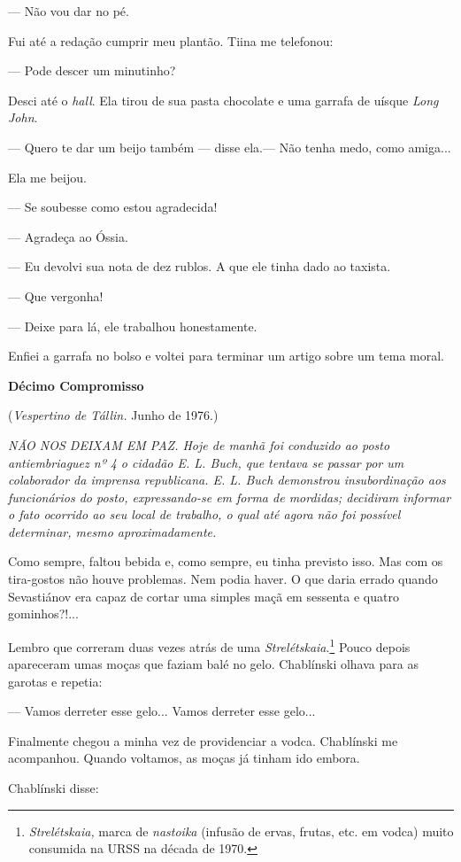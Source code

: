 --- Não vou dar no pé.

Fui até a redação cumprir meu plantão. Tiina me telefonou:

--- Pode descer um minutinho?

Desci até o \emph{hall}. Ela tirou de sua pasta chocolate e uma garrafa
de uísque \emph{Long John}.

--- Quero te dar um beijo também --- disse ela.--- Não tenha medo, como
amiga...

Ela me beijou.

--- Se soubesse como estou agradecida!

--- Agradeça ao Óssia.

--- Eu devolvi sua nota de dez rublos. A que ele tinha dado ao taxista.

--- Que vergonha!

--- Deixe para lá, ele trabalhou honestamente.

Enfiei a garrafa no bolso e voltei para terminar um artigo sobre um tema
moral.

\textbf{Décimo Compromisso}

(\emph{Vespertino de Tállin.} Junho de 1976.)

\emph{NÃO NOS DEIXAM EM PAZ. Hoje de manhã foi conduzido ao posto
antiembriaguez nº 4 o cidadão E. L. Buch, que tentava se passar por um
colaborador da imprensa republicana. E. L. Buch demonstrou
insubordinação aos funcionários do posto, expressando-se em forma de
mordidas; decidiram informar o fato ocorrido ao seu local de trabalho, o
qual até agora não foi possível determinar, mesmo aproximadamente.}

Como sempre, faltou bebida e, como sempre, eu tinha previsto isso. Mas
com os tira-gostos não houve problemas. Nem podia haver. O que daria
errado quando Sevastiánov era capaz de cortar uma simples maçã em
sessenta e quatro gominhos?!...

Lembro que correram duas vezes atrás de uma
\emph{Strelétskaia}.\footnote{\emph{Strelétskaia,} marca de
  \emph{nastoika} (infusão de ervas, frutas, etc. em vodca) muito
  consumida na URSS na década de 1970.} Pouco depois apareceram umas
moças que faziam balé no gelo. Chablínski olhava para as garotas e
repetia:

--- Vamos derreter esse gelo... Vamos derreter esse gelo...

Finalmente chegou a minha vez de providenciar a vodca. Chablínski me
acompanhou. Quando voltamos, as moças já tinham ido embora.

Chablínski disse:

